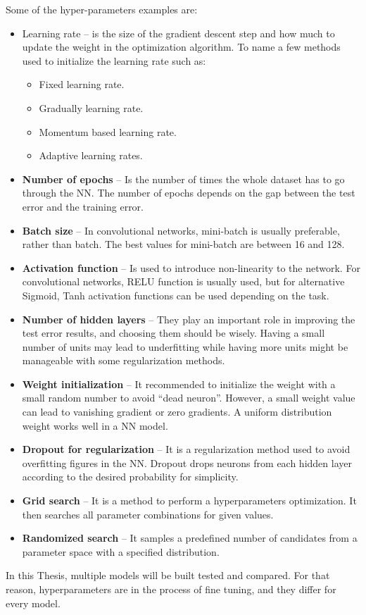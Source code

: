 Some of the hyper-parameters examples are:
\begin{itemize}
\item Learning rate – is the size of the gradient descent step and how much to update the weight in the optimization algorithm. To name a few methods used to initialize the learning rate such as:
\begin{itemize}
\item Fixed learning rate.
\item Gradually learning rate.
\item Momentum based learning rate.
\item Adaptive learning rates.  
\end{itemize}
\item \textbf{Number of epochs} – Is the number of times the whole dataset has to go through the NN. The number of epochs depends on the gap between the test error and the training error.
\item \textbf{Batch size} – In convolutional networks, mini-batch is usually preferable, rather than batch. The best values for mini-batch are between 16 and 128.
\item \textbf{Activation function} – Is used to introduce non-linearity to the network. For convolutional networks, RELU function is usually used, but for alternative Sigmoid, Tanh activation functions can be used depending on the task. 
\item \textbf{Number of hidden layers} – They play an important role in improving the test error results, and choosing them should be wisely. Having a small number of units may lead to underfitting while having more units might be manageable with some regularization methods.
\item \textbf{Weight initialization} – It recommended to initialize the weight with a small random number to avoid “dead neuron”. However, a small weight value can lead to vanishing gradient or zero gradients. A uniform distribution weight works well in a NN model.
\item \textbf{Dropout for regularization} – It is a regularization method used to avoid overfitting figures in the NN. Dropout drops neurons from each hidden layer according to the desired probability for simplicity.
\item \textbf{Grid search} – It is a method to perform a hyperparameters optimization. It then searches all parameter combinations for given values.
\item \textbf{Randomized search} – It samples a predefined number of candidates from a parameter space with a specified distribution.  
\end{itemize}
\hspace{5mm} In this Thesis, multiple models will be built tested and compared. For that reason, hyperparameters are in the process of fine tuning, and they differ for every model.


